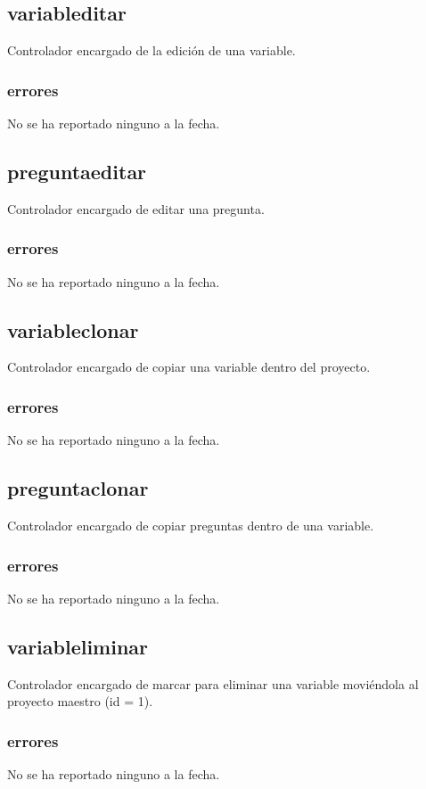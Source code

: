 \documentclass[10pt,a4paper]{book}
\begin{document}
	\subsection{variableditar}
	Controlador encargado de la edición de una variable.
	\subsubsection{errores}
	No se ha reportado ninguno a la fecha.
	
	\subsection{preguntaeditar}
	Controlador encargado de editar una pregunta.
	\subsubsection{errores}
	No se ha reportado ninguno a la fecha.
	
	\subsection{variableclonar}
	Controlador encargado de copiar una variable dentro del proyecto.
	\subsubsection{errores}
	No se ha reportado ninguno a la fecha.
	
	\subsection{preguntaclonar}
	Controlador encargado de copiar preguntas dentro de una variable.
	\subsubsection{errores}
	No se ha reportado ninguno a la fecha.
	
	\subsection{variableliminar}
	Controlador encargado de marcar para eliminar una variable moviéndola al proyecto maestro (id = 1).
	\subsubsection{errores}
	No se ha reportado ninguno a la fecha.
	
\end{document}
